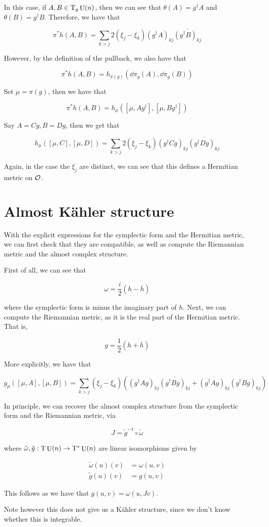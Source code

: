 \documentclass{article}
\DeclareMathOperator{\U}{U}
\begin{document}
In this case, if \(A, B \in \TT_g\U(n)\), then we can see that \(\theta(A) = g^\dagger A\) and \(\theta(B) = g^\dagger B\). Therefore, we have that

\[\pi^*h(A, B) = \sum_{k > j}2(\xi_j - \xi_k)(g^\dagger A)_{kj}\overline{(g^\dagger B)_{kj}}\]

However, by the definition of the pullback, we also have that

\[\pi^*h(A, B) = h_{\pi(g)}(\dd \pi_g(A), \dd\pi_g(B))\]

Set \(\mu = \pi(g)\), then we have that

\[\pi^*h(A, B) = h_\mu([\mu, Ag^\dagger], [\mu, Bg^\dagger])\]

Say \(A = Cg, B = Dg\), then we get that

\[h_\mu([\mu, C], [\mu, D]) = \sum_{k > j}2(\xi_j - \xi_k)(g^\dagger Cg)_{kj}\overline{(g^\dagger Dg)_{kj}}\]

Again, in the case the \(\xi_j\) are distinct, we can see that this defines a Hermitian metric on \(\mathcal{O}\).

\section{Almost K\"ahler structure}

With the explicit expressions for the symplectic form and the Hermitian metric, we can first check that they are compatible, as well as compute the Riemannian metric and the almost complex structure.

First of all, we can see that

\[\omega = \frac{i}{2}(h - \overline h)\]

where the symplectic form is minus the imaginary part of \(h\). Next, we can compute the Riemannian metric, as it is the real part of the Hermitian metric. That is,

\[g = \frac{1}{2}(h + \overline h)\]

More explicitly, we have that

\[g_\mu([\mu, A], [\mu, B]) = \sum_{k > j}(\xi_j - \xi_k)\left((g^\dagger A g)_{kj}\overline{(g^\dagger Bg)_{kj}} + \overline{(g^\dagger Ag)_{kj}}(g^\dagger Bg)_{kj}\right)\]

In principle, we can recover the almost complex structure from the symplectic form and the Riemannian metric, via

\[J = \tilde g^{-1} \circ \tilde\omega\]

where \(\tilde\omega, \tilde g : \TT \U(n) \to \TT^*\U(n)\) are linear isomorphisms given by

\begin{align*}
    \tilde \omega(u)(v) &= \omega(u, v) \\
    \tilde g(u)(v) &= g(u, v)
\end{align*}

This follows as we have that \(g(u, v) = \omega(u, Jv)\).

Note however this does not give us a K\"ahler structure, since we don't know whether this is integrable.
\end{document}
